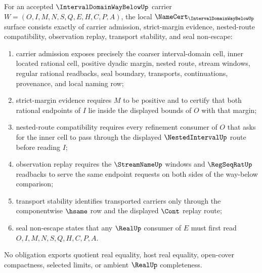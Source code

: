 \begin{theorem}
\label{thm:interval-domain-way-below-namecert-obligations}
For an accepted $\IntervalDomainWayBelowUp$ carrier $W=(O,I,M,N,S,Q,E,H,C,P,A)$, the local $\NameCert_{\IntervalDomainWayBelowUp}$ surface consists exactly of carrier admission, strict-margin evidence, nested-route compatibility, observation replay, transport stability, and seal non-escape:
\begin{enumerate}
\item carrier admission exposes precisely the coarser interval-domain cell, inner located rational cell, positive dyadic margin, nested route, stream windows, regular rational readbacks, seal boundary, transports, continuations, provenance, and local naming row;
\item strict-margin evidence requires $M$ to be positive and to certify that both rational endpoints of $I$ lie inside the displayed bounds of $O$ with that margin;
\item nested-route compatibility requires every refinement consumer of $O$ that asks for the inner cell to pass through the displayed $\NestedIntervalUp$ route before reading $I$;
\item observation replay requires the $\StreamNameUp$ windows and $\RegSeqRatUp$ readbacks to serve the same endpoint requests on both sides of the way-below comparison;
\item transport stability identifies transported carriers only through the componentwise $\hsame$ row and the displayed $\Cont$ replay route;
\item seal non-escape states that any $\RealUp$ consumer of $E$ must first read $O,I,M,N,S,Q,H,C,P,A$.
\end{enumerate}
No obligation exports quotient real equality, host real equality, open-cover compactness, selected limits, or ambient $\RealUp$ completeness.
\end{theorem}
